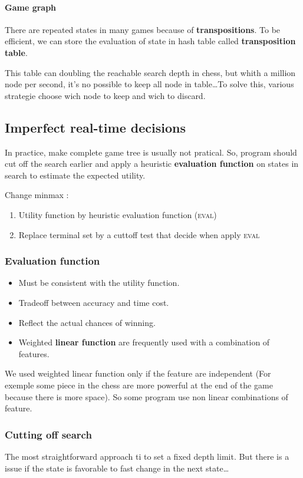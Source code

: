 \paragraph{Game graph} There are repeated states in many games because of \textbf{transpositions}.
To be efficient, we can store the evaluation of state in hash table called \textbf{transposition
table}.

This table can doubling the reachable search depth in chess, but whith a million node per second,
it's no possible to keep all node in table\ldots To solve this, various strategie
choose wich node to keep and wich to discard.

\subsection{Imperfect real-time decisions}
In practice, make complete game tree is usually not pratical.
So, program should cut off the search earlier and apply a heuristic \textbf{evaluation
function} on states in search to estimate the expected utility.

Change minmax :
\begin{enumerate}
    \item Utility function by heuristic evaluation function (\textsc{eval})
    \item Replace terminal set by a cuttoff test that decide when apply \textsc{eval}
\end{enumerate}

\subsubsection{Evaluation function}
\begin{itemize}
    \item Must be consistent with the utility function.
    \item Tradeoff between accuracy and time cost.
    \item Reflect the actual chances of winning.
    \item Weighted \textbf{linear function} are frequently used with a combination of features.
\end{itemize}

We used weighted linear function only if the feature are independent (For exemple some piece in the chess
are more powerful at the end of the game because there is more space). So some program use non linear 
combinations of feature. 


\subsubsection{Cutting off search}
The most straightforward approach ti to set a fixed depth limit.
But there is a issue if the state is favorable to fast change in the next
state\ldots 

